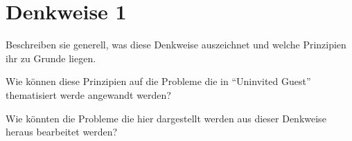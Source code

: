 \section{Denkweise 1}

Beschreiben sie generell, was diese Denkweise auszeichnet und welche Prinzipien ihr zu Grunde liegen. 

Wie können diese Prinzipien auf die Probleme die in ``Uninvited Guest'' thematisiert werde angewandt werden? 

Wie könnten die Probleme die hier dargestellt werden aus dieser Denkweise heraus bearbeitet werden? 